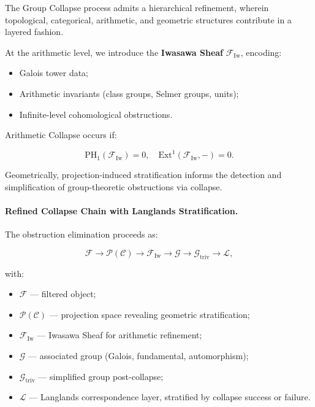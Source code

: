 \documentclass[11pt]{article}
\begin{document}
The Group Collapse process admits a hierarchical refinement, wherein topological, categorical, arithmetic, and geometric structures contribute in a layered fashion.

At the arithmetic level, we introduce the \textbf{Iwasawa Sheaf} \( \mathcal{F}_{\mathrm{Iw}} \), encoding:

\begin{itemize}
    \item Galois tower data;
    \item Arithmetic invariants (class groups, Selmer groups, units);
    \item Infinite-level cohomological obstructions.
\end{itemize}

Arithmetic Collapse occurs if:

\[
\mathrm{PH}_1(\mathcal{F}_{\mathrm{Iw}}) = 0, \quad \mathrm{Ext}^1(\mathcal{F}_{\mathrm{Iw}}, -) = 0.
\]

Geometrically, projection-induced stratification informs the detection and simplification of group-theoretic obstructions via collapse.

\paragraph{Refined Collapse Chain with Langlands Stratification.}

The obstruction elimination proceeds as:

\[
\mathcal{F} \longrightarrow \mathcal{P}(\mathcal{C}) \longrightarrow \mathcal{F}_{\mathrm{Iw}} \longrightarrow \mathcal{G} \longrightarrow \mathcal{G}_{\mathrm{triv}} \longrightarrow \mathcal{L},
\]

with:

\begin{itemize}
    \item \( \mathcal{F} \) — filtered object;
    \item \( \mathcal{P}(\mathcal{C}) \) — projection space revealing geometric stratification;
    \item \( \mathcal{F}_{\mathrm{Iw}} \) — Iwasawa Sheaf for arithmetic refinement;
    \item \( \mathcal{G} \) — associated group (Galois, fundamental, automorphism);
    \item \( \mathcal{G}_{\mathrm{triv}} \) — simplified group post-collapse;
    \item \( \mathcal{L} \) — Langlands correspondence layer, stratified by collapse success or failure.
\end{itemize}
\end{document}
